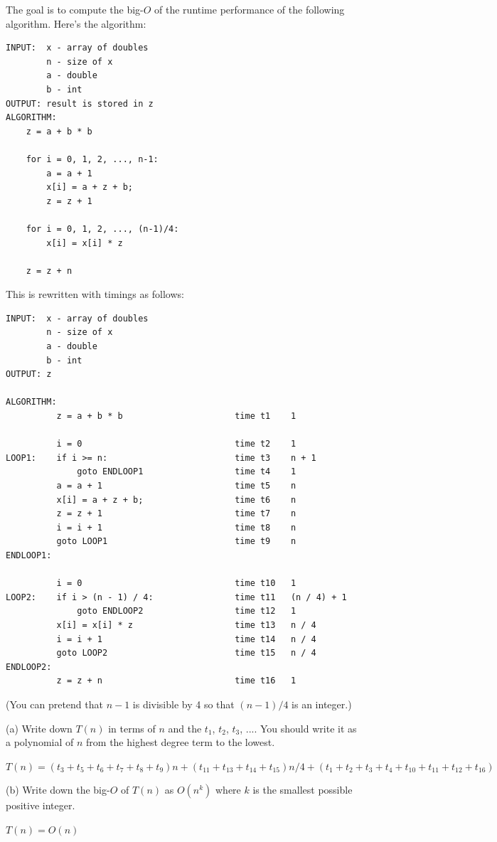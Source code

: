 The goal is to compute the big-$O$ of the runtime performance
of the following algorithm. 
Here's the algorithm:
\begin{Verbatim}[frame=single]
INPUT:  x - array of doubles
        n - size of x
        a - double
        b - int
OUTPUT: result is stored in z
ALGORITHM:
    z = a + b * b                          

    for i = 0, 1, 2, ..., n-1:
        a = a + 1                          
        x[i] = a + z + b;                  
        z = z + 1                          

    for i = 0, 1, 2, ..., (n-1)/4:
        x[i] = x[i] * z                    

    z = z + n                              
\end{Verbatim}
This is rewritten with timings as follows:
\begin{Verbatim}[frame=single]
INPUT:  x - array of doubles
        n - size of x
        a - double
        b - int
OUTPUT: z

ALGORITHM:
          z = a + b * b                      time t1    1

          i = 0                              time t2    1
LOOP1:    if i >= n:                         time t3    n + 1
              goto ENDLOOP1                  time t4    1
          a = a + 1                          time t5    n
          x[i] = a + z + b;                  time t6    n
          z = z + 1                          time t7    n
          i = i + 1                          time t8    n
          goto LOOP1                         time t9    n
ENDLOOP1:

          i = 0                              time t10   1
LOOP2:    if i > (n - 1) / 4:                time t11   (n / 4) + 1
              goto ENDLOOP2                  time t12   1
          x[i] = x[i] * z                    time t13   n / 4
          i = i + 1                          time t14   n / 4
          goto LOOP2                         time t15   n / 4
ENDLOOP2:
          z = z + n                          time t16   1
\end{Verbatim}

(You can pretend that $n - 1$ is divisible by 4 so that
$(n - 1)/4$ is an integer.)

(a) Write down $T(n)$ in terms of $n$ and the 
$t_1$, $t_2$, $t_3$, ....
You should write it as a polynomial of $n$ from the highest
degree term to the lowest.

$T(n) = (t_{3} + t_{5} + t_{6} + t_{7} + t_{8} + t_{9})n + (t_{11} + t_{13} + t_{14} + t_{15})n/4 + (t_{1} + t_{2} + t_{3} + t_{4} + t_{10} + t_{11} + t_{12} + t_{16})$

(b) Write down the big-$O$ of $T(n)$ as $O(n^k)$
where $k$ is the smallest possible  positive integer.

$T(n) = O(n)$
